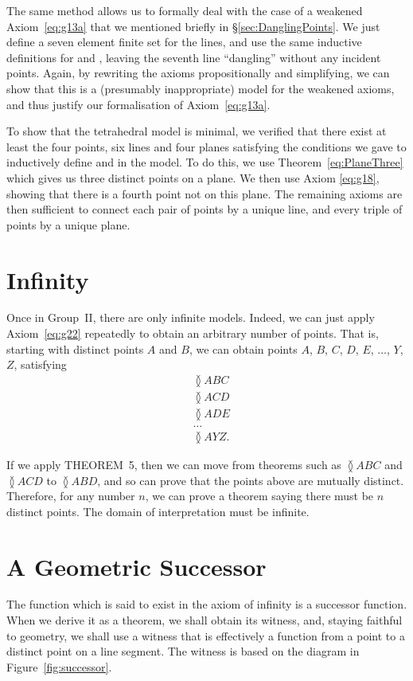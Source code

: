 The same method allows us to formally deal with the case of a weakened Axiom~\ref{eq:g13a} that we mentioned briefly in \S\ref{sec:DanglingPoints}. We just define a seven element finite set for the lines, and use the same inductive definitions for  and , leaving the seventh line ``dangling'' without any incident points. Again, by rewriting the axioms propositionally and simplifying, we can show that this is a (presumably inappropriate) model for the weakened axioms, and thus justify our formalisation of Axiom~\ref{eq:g13a}.

To show that the tetrahedral model is minimal, we verified that there exist at least the four points, six lines and four planes satisfying the conditions we gave to inductively define  and  in the model. To do this, we use Theorem~\ref{eq:PlaneThree} which gives us three distinct points on a plane. We then use Axiom \ref{eq:g18}, showing that there is a fourth point not on this plane. The remaining axioms are then sufficient to connect each pair of points by a unique line, and every triple of points by a unique plane.

\section{Infinity}\label{sec:Infinity}
Once in Group~II, there are only infinite models. Indeed, we can just apply Axiom~\ref{eq:g22} repeatedly to obtain an arbitrary number of points. That is, starting with distinct points $A$ and $B$, we can obtain points $A$, $B$, $C$, $D$, $E$, $\ldots$, $Y$, $Z$, satisfying 
\begin{align*}
&\between{A}{B}{C}\\
&\between{A}{C}{D}\\
&\between{A}{D}{E}\\
&\ldots\\
&\between{A}{Y}{Z}.
\end{align*}

If we apply THEOREM~5, then we can move from theorems such as $\between{A}{B}{C}$ and $\between{A}{C}{D}$ to $\between{A}{B}{D}$, and so can prove that the points above are mutually distinct. Therefore, for any number $n$, we can prove a theorem saying there must be $n$ distinct points. The domain of interpretation must be infinite.

\section{A Geometric Successor}
The function which is said to exist in the axiom of infinity is a successor function. When we derive it as a theorem, we shall obtain its witness, and, staying faithful to geometry, we shall use a witness that is effectively a function from a point to a distinct point on a line segment. The witness is based on the diagram in Figure~\ref{fig:successor}.

